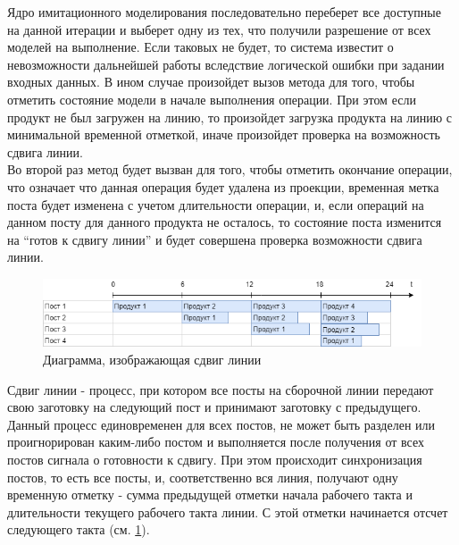 \indent Ядро имитационного моделирования последовательно переберет все доступные на данной итерации и выберет одну из тех, что получили разрешение от всех моделей на выполнение.
Если таковых не будет, то система известит о невозможности дальнейшей работы вследствие логической ошибки при задании входных данных.
В ином случае произойдет вызов метода для того, чтобы отметить состояние модели в начале выполнения операции.
При этом если продукт не был загружен на линию, то произойдет загрузка продукта на линию с минимальной временной отметкой, иначе произойдет проверка на возможность сдвига линии.\\
\indent Во второй раз метод будет вызван для того, чтобы отметить окончание операции, что означает что данная операция будет удалена из проекции, временная метка поста будет изменена с учетом длительности операции, и, если операций на данном посту для данного продукта не осталось, то состояние поста изменится на ``готов к сдвигу линии'' и будет совершена проверка возможности сдвига линии.

\begin{figure}[ht]
	\centering
	\includegraphics[width=\linewidth]{pics/assemblyDiagram.png}
	\caption{Диаграмма, изображающая сдвиг линии}
	\label{fig:lineDiagram}
\end{figure}

\indent Сдвиг линии - процесс, при котором все посты на сборочной линии передают свою заготовку на следующий пост и принимают заготовку с предыдущего.
Данный процесс единовременен для всех постов, не может быть разделен или проигнорирован каким-либо постом и выполняется после получения от всех постов сигнала о готовности к сдвигу.
При этом происходит синхронизация постов, то есть все посты, и, соответственно вся линия, получают одну временную отметку - сумма предыдущей отметки начала рабочего такта и длительности текущего рабочего такта линии.
С этой отметки начинается отсчет следующего такта (см. \ref{fig:lineDiagram}).

